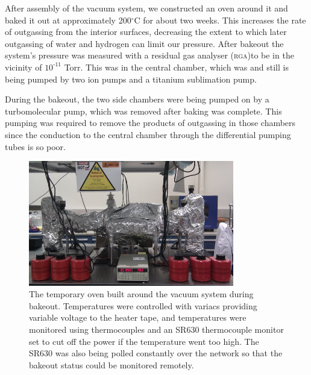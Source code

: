 After assembly of the vacuum system, we constructed an oven around it and baked it out at approximately 200$^\circ$C for about two weeks. This increases the rate of outgassing from the interior surfaces, decreasing the extent to which later outgassing of water and hydrogen can limit our pressure. After bakeout the system's pressure was measured with a residual gas analyser (\textsc{rga})to be in the vicinity of $10^{\textrm{{-11}}}$ Torr. This was in the central chamber, which was and still is being pumped by two ion pumps and a titanium sublimation pump.

During the bakeout, the two side chambers were being pumped on by a turbomolecular pump, which was removed after baking was complete. This pumping was required to remove the products of outgassing in those chambers since the conduction to the central chamber through the differential pumping tubes is so poor.

\begin{figure}
\begin{center}
\includegraphics[width=0.8\textwidth]{figures/unsorted/bakeout.png}
\caption{\label{fig:bakeout}The temporary oven built around the vacuum system during bakeout. Temperatures were controlled with variacs providing variable voltage to the heater tape, and temperatures were monitored using thermocouples and an \textsc{SR}630 thermocouple monitor set to cut off the power if the temperature went too high. The \textsc{SR}630 was also being polled constantly over the network so that the bakeout status could be monitored remotely.}
\end{center}
\end{figure}

